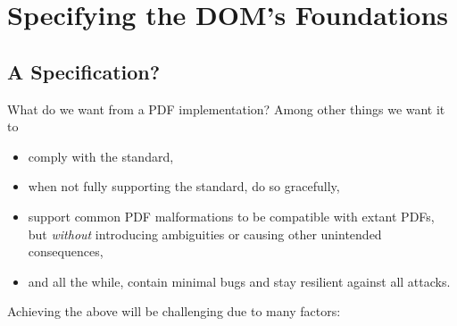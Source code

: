 
\section{Specifying the DOM's Foundations }
\label{sec:specifying}

\subsection{A Specification?}

What do we want from a PDF implementation?
Among other things we want it to
\begin{itemize}
\item comply with the standard,
\item when not fully supporting the standard, do so gracefully,
\item support common PDF malformations
  to be compatible with extant PDFs, but \emph{without} introducing ambiguities
  or causing other unintended consequences,
\item and all the while, contain minimal bugs and stay resilient against all attacks.
\end{itemize}
Achieving the above will be challenging due to many factors:
